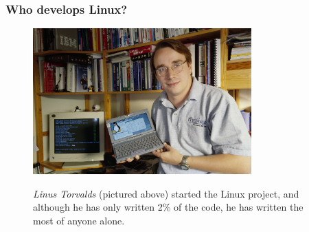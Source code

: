 \documentclass{lug}
\begin{document}
\begin{frame}
    \frametitle{Who develops Linux?}

    \begin{figure}
        \includegraphics[width=0.75\textwidth]{graphics/torvaldslinux}

        \bigskip

        \begin{minipage}{0.75\textwidth}
            \centering
            \small
        \emph{Linus Torvalds} (pictured above) started the Linux project, and although
        he has only written 2\% of the code, he has written the most of anyone
        alone.
        \end{minipage}
    \end{figure}

\end{frame}
\end{document}
